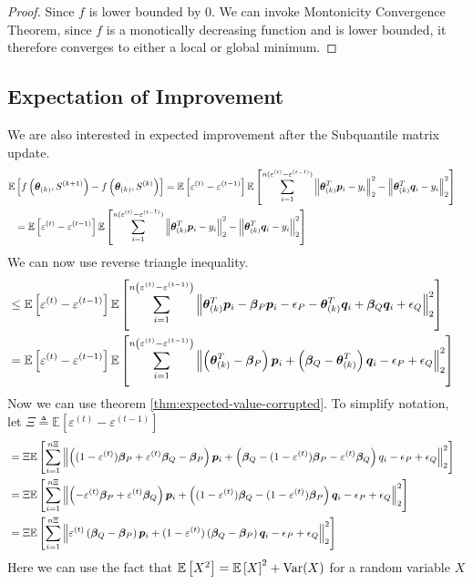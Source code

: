 \documentclass{article} %
\newcommand{\norm}[1]{\left\lVert#1\right\rVert}
\begin{document}
\begin{appendices}
\begin{proof}
	Since $f$ is lower bounded by $0$. We can invoke Montonicity Convergence Theorem, since $f$ is a monotically decreasing function and is lower bounded, it therefore converges to either a local or global minimum. 
	\end{proof}
	
	\subsection{Expectation of Improvement}
	We are also interested in expected improvement after the Subquantile matrix update. 
	\begin{align*}
		\mathbb{E}&\left[f\left(\vtheta_{(k)}, S^{(k+1)}\right) - f\left(\vtheta_{(k)}, S^{(k)}\right)\right] = \mathbb{E}\left[\varepsilon^{(t)} - \varepsilon^{(t-1)}\right]\mathbb{E}\left[\sum_{i=1}^{n(\varepsilon^{(t)}-\varepsilon^{(t-1)})}\norm{\vtheta_{(k)}^T\vp_i -y_i}_2^2 - \norm{\vtheta_{(k)}^T\vq_i - y_i}_2^2\right] &&\\
		&= \mathbb{E}\left[\varepsilon^{(t)} - \varepsilon^{(t-1)}\right]\mathbb{E}\left[\sum_{i=1}^{n(\varepsilon^{(t)}-\varepsilon^{(t-1)})}\norm{\vtheta_{(k)}^T\vp_i -y_i}_2^2 - \norm{\vtheta_{(k)}^T\vq_i - y_i}_2^2\right] &&
	\end{align*}
	We can now use reverse triangle inequality.
	\begin{align*}
		&\leq \mathbb{E}\left[\varepsilon^{(t)} - \varepsilon^{(t-1)}\right] \mathbb{E}\left[\sum_{i=1}^{n\left(\varepsilon^{(t)}-\varepsilon^{(t-1)}\right)}\norm{\vtheta_{(k)}^T\vp_i - \vbeta_P\vp_i - \eps_P - \vtheta^T_{(k)}\vq_i + \vbeta_Q\vq_i + \eps_Q}_2^2 \right] &&\\
		&= \mathbb{E}\left[\varepsilon^{(t)} - \varepsilon^{(t-1)}\right] \mathbb{E}\left[\sum_{i=1}^{n\left(\varepsilon^{(t)}-\varepsilon^{(t-1)}\right)}\norm{\left(\vtheta^T_{(k)} - \vbeta_P\right)\vp_i + \left(\vbeta_Q - \vtheta^T_{(k)}\right)\vq_i - \eps_P+ \eps_Q}_2^2 \right] &&
	\end{align*}
	Now we can use theorem \ref{thm:expected-value-corrupted}. To simplify notation, let $\Xi \triangleq \mathbb{E}\left[\varepsilon^{(t)} - \varepsilon^{(t-1)}\right]$
	\begin{align*}
		&= \Xi \mathbb{E}\left[\sum_{i=1}^{n\Xi}\norm{\left((1-\varepsilon^{(t)})\vbeta_P + \varepsilon^{(t)}\vbeta_Q - \vbeta_P\right)\vp_i + \left(\vbeta_Q - (1 - \varepsilon^{(t)})\vbeta_P - \varepsilon^{(t)}\vbeta_Q \right)q_i - \eps_P+ \eps_Q}_2^2 \right] &&\\
		&= \Xi \mathbb{E}\left[\sum_{i=1}^{n\Xi}\norm{\left(-\varepsilon^{(t)}\vbeta_P + \varepsilon^{(t)}\vbeta_Q\right)\vp_i + \left((1 - \varepsilon^{(t)})\vbeta_Q - (1 - \varepsilon^{(t)})\vbeta_P\right)\vq_i - \eps_P+ \eps_Q}_2^2 \right] &&\\
		&= \Xi \mathbb{E}\left[\sum_{i=1}^{n\Xi}\norm{\varepsilon^{(t)}\left(\vbeta_Q - \vbeta_P\right)\vp_i + (1 - \varepsilon^{(t)})\left(\vbeta_Q - \vbeta_P\right)\vq_i - \eps_P+ \eps_Q}_2^2 \right] &&
	\end{align*}
	Here we can use the fact that $\mathbb{E}\left[X^2\right] = \mathbb{E}\left[X\right]^2 + \mathrm{Var}(X)$ for a random variable $X$


\end{appendices}
\end{document}
